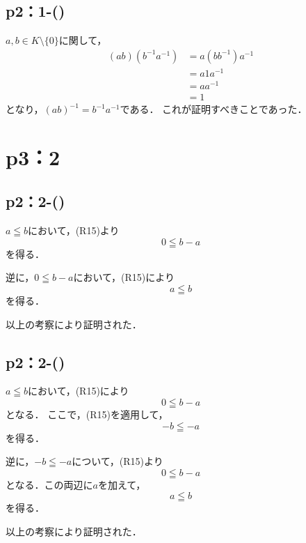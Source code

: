 \subsection*{p2：1-()}
\begin{tproof}
    $ a ,b\in K \setminus \{ 0 \} $に関して，
    \begin{align*}
        (ab) (b^{-1} a^{-1}) & = a (bb^{-1}) a^{-1} \\
                             & = a1a^{-1}           \\
                             & = aa^{-1}            \\
                             & = 1
    \end{align*}
    となり，$(ab)^{-1} = b^{-1} a^{-1}$である．
    これが証明すべきことであった．
\end{tproof}
%
\newpage
\section*{p3：2}

\subsection*{p2：2-()}
\begin{tproof}
    $a \leqq b$において，(R15)より
    \[
        0 \leqq b-a
    \]
    を得る．

    逆に，$0 \leqq b-a$において，(R15)により
    \[
        a \leqq b
    \]
    を得る．

    以上の考察により証明された．
\end{tproof}

\subsection*{p2：2-()}
\begin{tproof}
    $a \leqq b$において，(R15)により
    \[
        0 \leqq b-a
    \]
    となる．
    ここで，(R15)を適用して，
    \[
        -b \leqq -a
    \]
    を得る．

    逆に，$-b\leqq -a$について，(R15)より
    \[
        0 \leqq b -a
    \]
    となる．この両辺に$a$を加えて，
    \[
        a \leqq b
    \]
    を得る．

    以上の考察により証明された．
\end{tproof}


